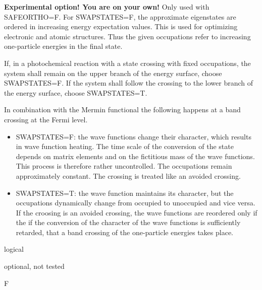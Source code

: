 \documentclass[final,12pt]{article}
\newcommand{\key}[1]{\hfill\break \makebox[1.5in][l]{\bf #1}\hfill\break}
\newcommand{\vdescr}[1]{\makebox[1in][l]{}\parbox[t]{110mm}{#1}\hfill\break}
\newcommand{\vformat}[1]{
\makebox[1in][l]{}\parbox[t]{110mm}{\makebox[1in][l]{Type:}\parbox[t]{2.7in}{#1}}
\hfill\break}
\newcommand{\vrules}[1]{
\makebox[1in][l]{}\parbox[t]{110mm}{\makebox[1in][l]{Rules:}\parbox[t]{2.7in}{#1}}
\hfill\break}
\newcommand{\vdefault}[1]{
\makebox[1in][l]{}\parbox[t]{110mm}
{\makebox[1in][l]{Default:}\parbox[t]{2.7in}{#1}}
\hfill\break}
\newcommand{\mbax}[1]{#1}
\begin{document}
\mbax{\key{SWAPSTATES}
\vdescr{\textbf{Experimental option! You are on your own!}
Only used with SAFEORTHO=F. For SWAPSTATES=F, the approximate
eigenstates are ordered in increasing energy expectation values. This
is used for optimizing electronic and atomic structures. Thus the
given occupations refer to increasing one-particle energies in the
final state.

If, in a photochemical reaction with a state crossing with fixed
occupations, the system shall remain on the upper branch of the energy
surface, choose SWAPSTATES=F. If the system shall follow the crossing
to the lower branch of the energy surface, choose  SWAPSTATES=T.

In combination with the Mermin functional the following happens at a
band crossing at the Fermi level.
\begin{itemize}
\item SWAPSTATES=F: the wave functions change their character, which
results in wave function heating. The time scale of the conversion of
the state depends on matrix elements and on the fictitious mass of the
wave functions. This process is therefore rather uncontrolled. The
occupations remain approximately constant. The crossing is treated
like an avoided crossing.
\item SWAPSTATES=T: the wave function maintains its character, but the
occupations dynamically change from occupied to unoccupied and vice
versa. If the croosing is an avoided crossing, the wave functions are
reordered only if the if the conversion of the character of the wave
functions is sufficiently retarded, that a band crossing of the
one-particle energies takes place.
\end{itemize}}
  \vformat{logical} 
  \vrules{optional, not tested}
  \vdefault{F}}  


\end{document}
